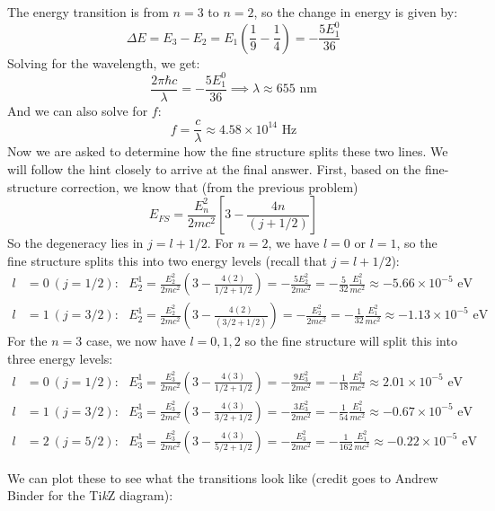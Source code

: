 \documentclass[10pt]{article}
\begin{document}
		\begin{solution}
			The energy transition is from $n = 3$ to $n = 2$, so the change in energy is given by: 
			\[ \Delta E = E_3 - E_2 = E_1 \left( \frac 19 - \frac 14\right) = -\frac{5E_1^0}{36}\]
			Solving for the wavelength, we get: 
			\[ \frac{2\pi \hbar c}{\lambda} = -\frac{5E_1^0}{36} \implies \lambda \approx 655 \text{ nm}\]
			And we can also solve for $f$: 
			\[ f = \frac{c}{\lambda} \approx 4.58 \times 10^{14} \text{ Hz}\]
			Now we are asked to determine how the fine structure splits these two lines. We will follow the hint closely to arrive at the final answer. First, based on the fine-structure correction, we know that (from the previous problem)
			\[ E_{FS} = \frac{E_n^2}{2mc^2}\left[ 3 - \frac{4n}{(j + 1/2)}\right]\]
			So the degeneracy lies in $j = l + 1/2$. For $n = 2$, we have $l = 0$ or $l = 1$, so the fine structure splits this into two energy levels (recall that $j = l + 1/2$): 
			\begin{align*}
				l &= 0 \ (j = 1/2): \ \ \ E_2^1 = \frac{E_2^2}{2mc^2}\left( 3 - \frac{4(2)}{1/2 + 1/2}\right) = -\frac{5E_2^2}{2mc^2} = -\frac{5}{32} \frac{E_1^2}{mc^2} \approx -5.66 \times 10^{-5} \text{ eV}\\
				l &= 1 \ (j = 3/2): \ \ \ E_2^1 = \frac{E_2^2}{2mc^2} \left( 3 - \frac{4(2)}{(3/2 + 1/2)}\right) = -\frac{E_2^2}{2mc^2} = -\frac{1}{32} \frac{E_1^2}{mc^2} \approx -1.13 \times 10^{-5} \text{ eV}
			\end{align*}
			For the $n=3$ case, we now have $l = 0, 1, 2$ so the fine structure will split this into three energy levels:
			\begin{align*}
				l &= 0 \ (j = 1/2): \ \ \ E_3^1 = \frac{E_3^2}{2mc^2}\left( 3 - \frac{4(3)}{1/2 + 1/2}\right) = -\frac{9E_3^2}{2mc^2} = -\frac{1}{18} \frac{E_1^2}{mc^2} \approx 2.01 \times 10^{-5} \text{ eV}\\
				l &= 1 \ (j = 3/2): \ \ \ E_3^1 = \frac{E_3^2}{2mc^2}\left( 3 - \frac{4(3)}{3/2 + 1/2}\right) = -\frac{3E_3^2}{2mc^2} = -\frac{1}{54} \frac{E_1^2}{mc^2} \approx -0.67 \times 10^{-5} \text{ eV}\\
				l &= 2 \ (j = 5/2): \ \ \ E_3^1 = \frac{E_3^2}{2mc^2}\left( 3 - \frac{4(3)}{5/2 + 1/2}\right) = -\frac{E_3^2}{2mc^2} = -\frac{1}{162} \frac{E_1^2}{mc^2} \approx -0.22 \times 10^{-5} \text{ eV}
			\end{align*}

			We can plot these to see what the transitions look like (credit goes to Andrew Binder for the Ti\textit{k}Z diagram):


\end{solution}
\end{document}
